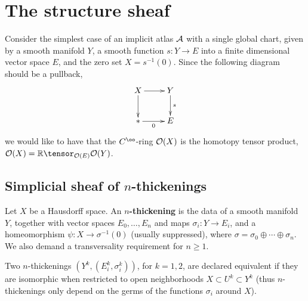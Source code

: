 
\section{The structure sheaf}

Consider the simplest case of an implicit atlas $\mathcal A$ with a single global chart, given by a smooth manifold $Y$, a smooth function $s: Y \to E$ into a finite dimensional vector space $E$, and the zero set $X = s^{-1}(0)$. Since the following diagram should be a pullback,
\[ \xymatrix{X \ar[r] \ar[d] & Y \ar[d]^-{s} \\ {*} \ar[r]_-{0} & E}\]
we would like to have that the $C^\oo$-ring $\mathcal O(X)$ is the homotopy tensor product, $\cO(X) = \RR \tensor_{\cO(E)} \cO(Y)$.


\subsection{Simplicial sheaf of $n$-thickenings}

\begin{defn}\label{n-thickening}
Let $X$ be a Hausdorff space. An {\bf $n$-thickening} is the data of a smooth manifold $Y$, together with vector spaces $E_0, \dots, E_n$ and maps $\sigma_i: Y \to E_i$, and a homeomorphism $\psi: X \to \sigma^{-1}(0)$ (usually suppressed), where $\sigma = \sigma_0 \oplus \cdots \oplus \sigma_n$. We also demand a transversality requirement for $n \geq 1$. 

Two $n$-thickenings $(Y^k, (E_i^k, \sigma_i^k))$, for $k = 1, 2$, are declared equivalent if they are isomorphic when restricted to open neighborhoods $X \subset U^k \subset Y^k$ (thus $n$-thickenings only depend on the germs of the functions $\sigma_i$ around $X$).
\end{defn}


